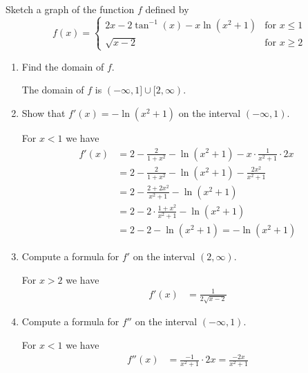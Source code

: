 \documentclass[nooutcomes,handout]{ximera}
\begin{document}
\begin{problem}
  Sketch a graph of the function $f$ defined by
  \[
    f(x) = \begin{cases}
             2x - 2\tan^{-1}(x) - x \ln(x^2+1) & \mbox{for $x \le 1$}\\
             \sqrt{x - 2} & \mbox{for $x \ge 2$}
           \end{cases}
  \]
  \begin{enumerate}
    \item Find the domain of $f$.
      \begin{freeResponse}
        The domain of $f$ is $(-\infty, 1] \cup [2, \infty)$.
      \end{freeResponse}

    \item Show that $f'(x) = -\ln(x^2+1)$ on the interval $(-\infty, 1)$.
   \begin{freeResponse}
        For $x < 1$ we have
        \begin{align*}
          f'(x) &= 2 - \frac{2}{1+x^2} - \ln(x^2+1) - x \cdot \frac{1}{x^2+1}\cdot 2x\\
                &= 2 - \frac{2}{1+x^2} - \ln(x^2+1) - \frac{2x^2}{x^2+1}\\
                &= 2 - \frac{2 + 2x^2}{x^2+1} - \ln(x^2+1)\\
                &= 2 -  2\cdot\frac{1+x^2}{x^2+1} - \ln(x^2+1)\\
                &= 2 - 2 - \ln(x^2 +1) = -\ln(x^2+1)
        \end{align*}
      \end{freeResponse}

    \item Compute a formula for $f'$ on the interval $(2, \infty)$.
      \begin{freeResponse}
        For $x > 2$ we have
        \begin{align*}
          f'(x) &= \frac{1}{2\sqrt{x-2}}
        \end{align*}
      \end{freeResponse}

    \item Compute a formula for $f''$ on the interval $(-\infty, 1)$.
       \begin{freeResponse}
        For $x < 1$ we have
        \begin{align*}
          f''(x) &= \frac{-1}{x^2+1} \cdot 2x = \frac{-2x}{x^2+1}
        \end{align*}
      \end{freeResponse}


\end{enumerate}
\end{problem}
\end{document}
